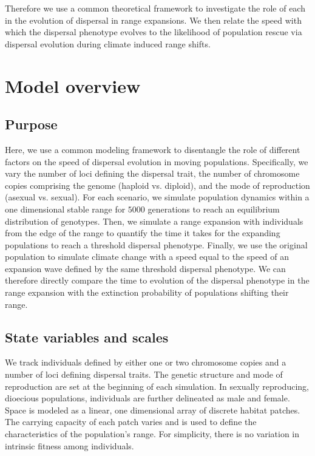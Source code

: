 \documentclass[11pt]{article}
\begin{document}
Therefore we use a common theoretical framework to investigate the role of each in the evolution of dispersal in range expansions. We then relate the speed with which the dispersal phenotype evolves to the likelihood of population rescue via dispersal evolution during climate induced range shifts.

\section*{Model overview}
\subsection*{Purpose} 
Here, we use a common modeling framework to disentangle the role of different factors on the speed of dispersal evolution in moving populations. Specifically, we vary the number of loci defining the dispersal trait, the number of chromosome copies comprising the genome (haploid vs. diploid), and the mode of reproduction (asexual vs. sexual). For each scenario, we simulate population dynamics within a one dimensional stable range for $5000$ generations to reach an equilibrium distribution of genotypes. Then, we simulate a range expansion with individuals from the edge of the range to quantify the time it takes for the expanding populations to reach a threshold dispersal phenotype. Finally, we use the original population to simulate climate change with a speed equal to the speed of an expansion wave defined by the same threshold dispersal phenotype. We can therefore directly compare the time to evolution of the dispersal phenotype in the range expansion with the extinction probability of populations shifting their range.

\subsection*{State variables and scales} 
We track individuals defined by either one or two chromosome copies and a number of loci defining dispersal traits. The genetic structure and mode of reproduction are set at the beginning of each simulation. In sexually reproducing, dioecious populations, individuals are further delineated as male and female. Space is modeled as a linear, one dimensional array of discrete habitat patches. The carrying capacity of each patch varies and is used to define the characteristics of the population's range. For simplicity, there is no variation in intrinsic fitness among individuals.
\end{document}
